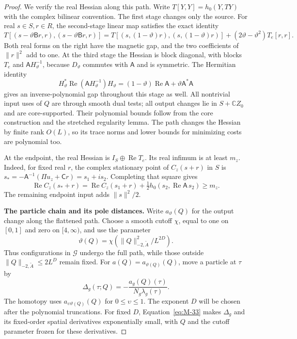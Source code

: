\begin{proof}
We verify the real Hessian along this path. Write
$T[Y,Y]=h_0(Y,TY)$ with the complex bilinear convention.
The first stage changes only the source. For real $s\in S,r\in R$,
the second-stage linear map satisfies the exact identity
\[
 T[(s-\vartheta\mathsf Br,r),(s-\vartheta\mathsf Br,r)]
 =T[(s,(1-\vartheta)r),(s,(1-\vartheta)r)]
       +(2\vartheta-\vartheta^2)T_e[r,r].
\]
Both real forms on the right have the magnetic gap, and the two
coefficients of $\|r\|^2$ add to one. At the third stage the
Hessian is block diagonal, with blocks $T_e$ and
$\mathsf A H_\vartheta^{-1}$, because $D_\vartheta$ commutes with
$\mathsf A$ and is symmetric. The Hermitian identity
\[
 H_\vartheta^*\operatorname{Re}(\mathsf A H_\vartheta^{-1})
       H_\vartheta
 =(1-\vartheta)\operatorname{Re}\mathsf A
       +\vartheta\mathsf A^*\mathsf A
\]
gives an inverse-polynomial gap throughout this stage as well.
All nontrivial input uses of $Q$ are through smooth dual tests; all
output changes lie in $S+\mathbb C Z_0$ and are core-supported.
Their polynomial bounds follow from the core construction and the
stretched regularity lemma. The path changes the Hessian by finite
rank $O(L)$, so its trace norms and lower bounds for minimizing costs
are polynomial too.

At the endpoint, the real Hessian is
$I_S\oplus\operatorname{Re}T_e$. Its real infimum is at least $m_z$.
Indeed, for fixed real $r$, the complex stationary point of
$C_z(s+r)$ in $S$ is
$s_*=-\mathsf A^{-1}(\Pi u_z+\mathsf Cr)=s_1+is_2$. Completing
that square gives
\[
 \operatorname{Re}C_z(s_*+r)
 =\operatorname{Re}C_z(s_1+r)
       +\tfrac12h_0(s_2,\operatorname{Re}\mathsf A\,s_2)
 \ge m_z.
\]
The remaining endpoint input adds $\|s\|^2/2$.

\par\smallskip\noindent\textbf{The particle chain and its pole distances.}
Write $a_\vartheta(Q)$ for the output change along the flattened
path. Choose a smooth cutoff $\chi$, equal to one on $[0,1]$ and
zero on $[4,\infty)$, and use the parameter
\[
 \vartheta(Q)=\chi(\|Q\|_{-2,\widetilde A}^2/L^{2D}).
\]
Thus configurations in $\mathcal G$ undergo the full path, while
those outside $\|Q\|_{-2,\widetilde A}\le2L^D$ remain fixed.
For $a(Q)=a_{\vartheta(Q)}(Q)$, move a particle at $\tau$ by
\[
 \Delta_g(\tau;Q)=-\frac{a_g(Q)(\tau)}{N_g\lambda_g(\tau)}.
\]
The homotopy uses $a_{\upsilon\vartheta(Q)}(Q)$ for
$0\le\upsilon\le1$.
The exponent $D$ will be chosen after the polynomial truncations.
For fixed $D$, Equation~\eqref{eq:M-33} makes $\Delta_g$ and its
fixed-order spatial derivatives exponentially small, with $Q$ and
the cutoff parameter frozen for these derivatives.


\end{proof}
